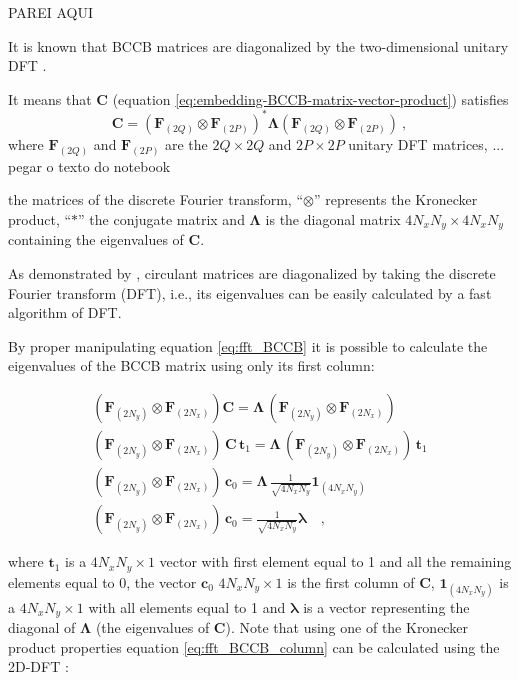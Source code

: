 \documentclass[manuscript,revised]{geophysics}
\begin{document}
PAREI AQUI

It is known that BCCB matrices are diagonalized by the two-dimensional unitary DFT
\citep[][p. 147]{jain1989}. 

It means that $\mathbf{C}$ (equation \ref{eq:embedding-BCCB-matrix-vector-product}) 
satisfies 
\begin{equation}
\mathbf{C} = 
\left(\mathbf{F}_{(2Q)} \otimes \mathbf{F}_{(2P)} \right)^{\ast} 
\mathbf{\Lambda}\left( \mathbf{F}_{(2Q)} \otimes \mathbf{F}_{(2P)} \right) \: ,
\label{eq:dft_BCCB}
\end{equation}
where $\mathbf{F}_{(2Q)}$ and $\mathbf{F}_{(2P)}$ are the $2Q \times 2Q$ and $2P \times 2P$ 
unitary DFT matrices, ... pegar o texto do notebook 

the matrices of the discrete Fourier transform, ``$\otimes$'' represents the Kronecker product, ``$\ast$'' the conjugate matrix and $\mathbf{\Lambda}$ is the diagonal matrix $4N_xN_y \times 4N_xN_y$ containing the eigenvalues of $\mathbf{C}$.

As demonstrated by \citet{grenander-szego1984}, circulant matrices are diagonalized by taking the discrete 
Fourier transform (DFT), i.e., its eigenvalues can be easily calculated by a fast algorithm of DFT. 




 By proper manipulating equation \ref{eq:fft_BCCB} it is possible to calculate the eigenvalues of the BCCB matrix using only its first column:

\begin{eqnarray}
\left( \mathbf{F}_{(2N_y)} \otimes \mathbf{F}_{(2N_x)} \right) \mathbf{C} = \mathbf{\Lambda} \, \left( \mathbf{F}_{(2N_y)} \otimes \mathbf{F}_{(2N_x)} \right) \\
\left( \mathbf{F}_{(2N_y)} \otimes \mathbf{F}_{(2N_x)} \right) \, \mathbf{C} \, \mathbf{t}_{1} = \mathbf{\Lambda} \, \left( \mathbf{F}_{(2N_y)} \otimes \mathbf{F}_{(2N_x)} \right) \, \mathbf{t}_{1} \\
\left( \mathbf{F}_{(2N_y)} \otimes \mathbf{F}_{(2N_x)} \right) \, \mathbf{c}_{0} = \mathbf{\Lambda} \, \frac{1}{\sqrt{4N_xN_y}}\mathbf{1}_{(4N_xN_y)} \\
\left( \mathbf{F}_{(2N_y)} \otimes \mathbf{F}_{(2N_x)} \right) \, \mathbf{c}_{0} = \frac{1}{\sqrt{4N_xN_y}} \mathbf{\lambda} \quad ,
\label{eq:fft_BCCB_column}
\end{eqnarray}

\noindent where $\mathbf{t}_{1}$ is a $4N_xN_y \times 1$ vector with first element equal to 1 and all the remaining elements equal to 0, the vector $\mathbf{c}_{0}$ $4N_xN_y \times 1$ is the first column of $\mathbf{C}$, $\mathbf{1}_{(4N_xN_y)}$ is a $4N_xN_y \times 1$ with all elements equal to 1 and $\mathbf{\lambda}$ is a vector representing the diagonal of $\mathbf{\Lambda}$ (the eigenvalues of $\mathbf{C}$). Note that using one of the Kronecker product properties equation \ref{eq:fft_BCCB_column} can be calculated using the 2D-DFT \citep{jain1989}:
\end{document}
